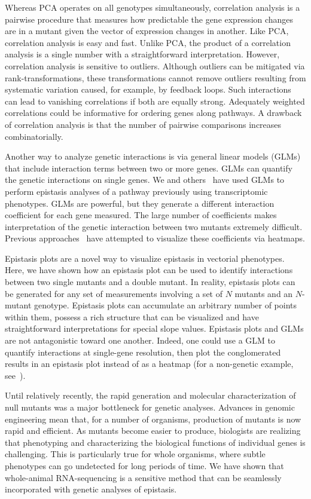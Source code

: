 \documentclass[9pt,twocolumn,twoside]{pnas-new}
\begin{document}
Whereas PCA operates on all genotypes simultaneously, correlation analysis is a
pairwise procedure that measures how predictable the gene expression changes are
in a mutant given the vector of expression changes in another. Like PCA,
correlation analysis is easy and fast. Unlike PCA, the product of a correlation
analysis is a single number with a straightforward interpretation. However,
correlation analysis is sensitive to outliers. Although outliers can be
mitigated via rank-transformations, these transformations cannot remove outliers
resulting from systematic variation caused, for example, by feedback loops. Such
interactions can lead to vanishing correlations if both are equally strong.
Adequately weighted correlations could be informative for ordering genes along
pathways. A drawback of correlation analysis is that the number of pairwise
comparisons increases combinatorially.

Another way to analyze genetic interactions is via general linear models (GLMs)
that include interaction terms between two or more genes. GLMs can quantify the
genetic interactions on single genes. We and others~\cite{Dixit2016,
Angeles-Albores2016a} have used GLMs to perform epistasis analyses of
a pathway previously using transcriptomic phenotypes. GLMs are powerful, but
they generate a different interaction coefficient for each gene measured. The
large number of coefficients makes interpretation of the genetic interaction
between two mutants extremely difficult. Previous approaches~\cite{Dixit2016}
have attempted to visualize these coefficients via heatmaps.

Epistasis plots are a novel way to visualize epistasis in vectorial phenotypes.
Here, we have shown how an epistasis plot can be used to identify interactions
between two single mutants and a double mutant. In reality, epistasis plots can
be generated for any set of measurements involving a set of $N$ mutants and an
$N$-mutant genotype. Epistasis plots can accumulate an arbitrary number of
points within them, possess a rich structure that can be visualized and have
straightforward interpretations for special slope values. Epistasis plots and
GLMs are not antagonistic toward one another. Indeed, one could use a GLM to
quantify interactions at single-gene resolution, then plot the conglomerated
results in an epistasis plot instead of as a heatmap (for a non-genetic example,
see~\cite{Angeles-Albores2016a}).

Until relatively recently, the rapid generation and molecular characterization
of null mutants was a major bottleneck for genetic analyses. Advances in
genomic engineering mean that, for a number of organisms, production of mutants
is now rapid and efficient. As mutants become easier to produce, biologists are
realizing that phenotyping and characterizing the biological functions of
individual genes is challenging. This is particularly true for whole organisms,
where subtle phenotypes can go undetected for long periods of time. We have
shown that whole-animal RNA-sequencing is a sensitive method that can be
seamlessly incorporated with genetic analyses of epistasis.
\end{document}
